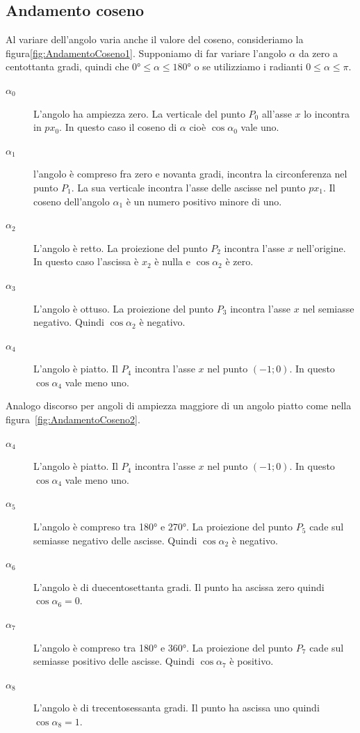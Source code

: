\subsection{Andamento coseno}
\label{sec:andamentocoseno}
Al variare dell'angolo varia anche il valore del coseno, consideriamo la figura\nobs\vref{fig:AndamentoCoseno1}. Supponiamo di far variare l'angolo $\alpha$ da zero a centottanta gradi, quindi che $\ang{0}\leq\alpha\leq\ang{180}$ o se utilizziamo i radianti $0\leq\alpha\leq\pi$. 
\begin{description}
	\item[$\alpha_0$] L'angolo ha ampiezza zero. La verticale del punto $P_0$ all'asse $x$ lo incontra in $px_0$. In questo caso il coseno di $\alpha$ cioè $\cos\alpha_0$ vale uno.
	\item [$\alpha_1$] l'angolo è compreso fra zero e novanta gradi, incontra la circonferenza nel punto $P_1$. La sua verticale incontra l'asse delle ascisse nel punto $px_1$. Il coseno dell'angolo $\alpha_1$ è un numero positivo minore di uno.
	\item [$\alpha_2$] L'angolo  è retto. La proiezione del punto $P_2$ incontra l'asse $x$ nell'origine. In questo caso l'ascissa è $x_2$ è   nulla e $\cos\alpha_2$ è zero. 
	\item [$\alpha_3$]  L'angolo è ottuso. La proiezione del punto $P_3$ incontra  l'asse $x$ nel semiasse negativo. Quindi $\cos\alpha_2$ è negativo.
	\item [$\alpha_4$] L'angolo  è  piatto. Il  $P_4$ incontra l'asse $x$ nel punto $(-1;0)$. In questo  $\cos\alpha_4$ vale meno uno.
\end{description}
Analogo discorso per angoli di ampiezza  maggiore di un angolo  piatto come nella figura~\vref{fig:AndamentoCoseno2}.
\begin{description}
	\item [$\alpha_4$] L'angolo è piatto. Il  $P_4$ incontra l'asse $x$ nel punto $(-1;0)$. In questo  $\cos\alpha_4$ vale meno uno.
	\item [$\alpha_5$] L'angolo è compreso tra \ang{180} e \ang{270}. La proiezione del punto $P_5$ cade sul semiasse negativo delle ascisse. Quindi $\cos\alpha_2$ è negativo.
	\item [$\alpha_6$] L'angolo è di duecentosettanta gradi. Il punto ha ascissa zero quindi  $\cos\alpha_6=0$.
	\item [$\alpha_7$] L'angolo è compreso tra \ang{180} e \ang{360}. La proiezione del punto $P_7$ cade sul semiasse positivo delle ascisse. Quindi $\cos\alpha_7$ è positivo.
	\item [$\alpha_8$] L'angolo è di trecentosessanta gradi. Il punto ha ascissa uno quindi  $\cos\alpha_8=1$.
\end{description}
